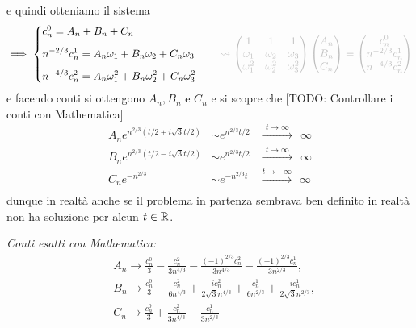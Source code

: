 e quindi otteniamo il sistema
$$
\implies
\left\{
\begin{aligned}
	& c_n^0 = A_n + B_n + C_n \\[1ex]
	& n^{-2/3} c_n^1 = A_n \omega_1 + B_n \omega_2 + C_n \omega_3 \\[1ex]
	& n^{-4/3} c_n^2 = A_n \omega_1^2 + B_n \omega_2^2 + C_n \omega_3^2
\end{aligned}
\right.
\qquad
\textcolor{lightgray}{\rightsquigarrow
\begin{pmatrix}
	1 & 1 & 1 \\
	\omega_1 & \omega_2 & \omega_3 \\
	\omega_1^2 & \omega_2^2 & \omega_3^2
\end{pmatrix}
\begin{pmatrix}
	A_n \\
	B_n \\
	C_n
\end{pmatrix}
=
\begin{pmatrix}
	c_n^0 \\
	n^{-2/3} c_n^1 \\
	n^{-4/3} c_n^2
\end{pmatrix}}
$$
e facendo conti si ottengono $A_n, B_n$ e $C_n$ e si scopre che 
[TODO: Controllare i conti con Mathematica]
$$
\begin{aligned}
	A_n e^{n^{2/3}(t/2 + i \sqrt 3 t / 2)} &\sim e^{n^{2/3}t / 2}
	&\xrightarrow{\;\,t \to \infty\,\;} \;\, \infty \\
	B_n e^{n^{2/3}(t/2 - i \sqrt 3 t / 2)} &\sim e^{n^{2/3}t / 2}
	&\xrightarrow{\;\,t \to \infty\,\;} \;\, \infty \\
	C_n e^{-n^{2/3}} &\sim e^{-n^{2/3} t}
	&\xrightarrow{t \to -\infty} \;\, \infty \\
\end{aligned}
$$
dunque in realtà anche se il problema in partenza sembrava ben definito in realtà non ha soluzione per alcun $t \in \mathbb R$.

\textit{Conti esatti con Mathematica:}
$$
\begin{aligned}
	& A_n \to \frac{c_n^0}{3}-\frac{c_n^2}{3 n^{4/3}}-\frac{(-1)^{2/3} c_n^2}{3 n^{4/3}}-\frac{(-1)^{2/3} c_n^1}{3
	n^{2/3}}, \\
	& B_n \to \frac{c_n^0}{3}-\frac{c_n^2}{6 n^{4/3}}+\frac{i c_n^2}{2 \sqrt{3} n^{4/3}}+\frac{c_n^1}{6 n^{2/3}}+\frac{i
	c_n^1}{2 \sqrt{3} n^{2/3}}, \\
	& C_n \to \frac{c_n^0}{3}+\frac{c_n^2}{3 n^{4/3}}-\frac{c_n^1}{3 n^{2/3}}
\end{aligned}
$$

